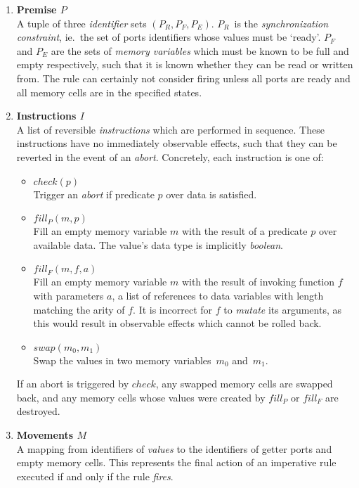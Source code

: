 \begin{enumerate}
	\item \textbf{Premise $P$}\\
	A tuple of three \textit{identifier} sets $(P_R, P_F, P_E)$. $P_R$~is the \textit{synchronization constraint}, ie.\ the set of ports identifiers whose values must be `ready'. $P_F$ and $P_E$ are the sets of \textit{memory variables} which must be known to be full and empty respectively, such that it is known whether they can be read or written from. The rule can certainly not consider firing unless all ports are ready and all memory cells are in the specified states.
	
	\item \textbf{Instructions $I$}\\
	A list of reversible \textit{instructions} which are performed in sequence. These instructions have no immediately observable effects, such that they can be reverted in the event of an \textit{abort}. Concretely, each instruction is one of:
	\begin{itemize}
		\item $check(p)$\\
		Trigger an \textit{abort} if predicate $p$ over data is satisfied.
		\item $fill_P(m, p)$\\Fill an empty memory variable $m$ with the result of a predicate $p$ over available data. The value's data type is implicitly \textit{boolean}.
		\item $fill_F(m, f, a)$\\
		Fill an empty memory variable $m$ with the result of invoking function $f$ with parameters $a$, a list of references to data variables with length matching the arity of $f$. It is incorrect for $f$ to \textit{mutate} its arguments, as this would result in observable effects which cannot be rolled back.
		\item $swap(m_0,m_1)$\\
		Swap the values in two memory variables~$m_0$ and~$m_1$.
	\end{itemize}
	If an abort is triggered by $check$, any swapped memory cells are swapped back, and any memory cells whose values were created by $fill_P$ or $fill_F$ are destroyed.
	
	\item \textbf{Movements $M$}\\
	A mapping from identifiers of \textit{values} to the identifiers of getter ports and empty memory cells. This represents the final action of an imperative rule executed if and only if the rule \textit{fires}.
\end{enumerate}

